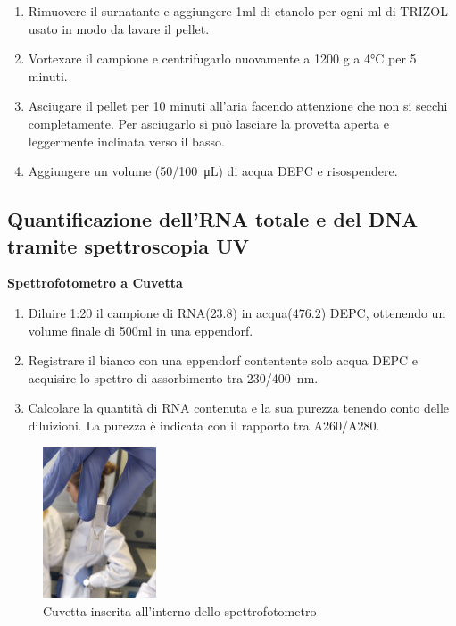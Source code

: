 \begin{enumerate}
\item Rimuovere il surnatante e aggiungere 1ml di etanolo per ogni ml di TRIZOL usato in modo da lavare il pellet.

\item Vortexare il campione e centrifugarlo nuovamente a 1200 g a 4°C per 5 minuti.

\item Asciugare il pellet per 10 minuti all’aria facendo attenzione che non si secchi completamente.
Per asciugarlo si pu\`o lasciare la provetta aperta e leggermente inclinata verso il basso.

\item Aggiungere un volume (\SI{50/100}{\micro\liter}) di acqua DEPC e risospendere.
\end{enumerate}

\subsection{Quantificazione dell’RNA totale e del DNA tramite spettroscopia UV}

\textbf{Spettrofotometro a Cuvetta}
\vspace{0.5cm}

\begin{enumerate}
\item  Diluire 1:20 il campione di RNA($23.8$) in acqua($476.2$) DEPC,
ottenendo un volume finale di 500ml in una eppendorf.
\item  Registrare il bianco con una eppendorf contentente solo acqua DEPC e acquisire
lo spettro di assorbimento tra \SI{230/400}{\nano\meter}.
\item  Calcolare la quantità di RNA contenuta e la sua purezza tenendo conto delle diluizioni.
La purezza è indicata con il rapporto tra A260/A280.
\end{enumerate}
\begin{figure}[H]

\centering
\includegraphics[width=0.3\textwidth]{./immagini/cuvetta.jpg}
\caption{Cuvetta inserita all'interno dello spettrofotometro}
\label{cuvetta}

\end{figure}

